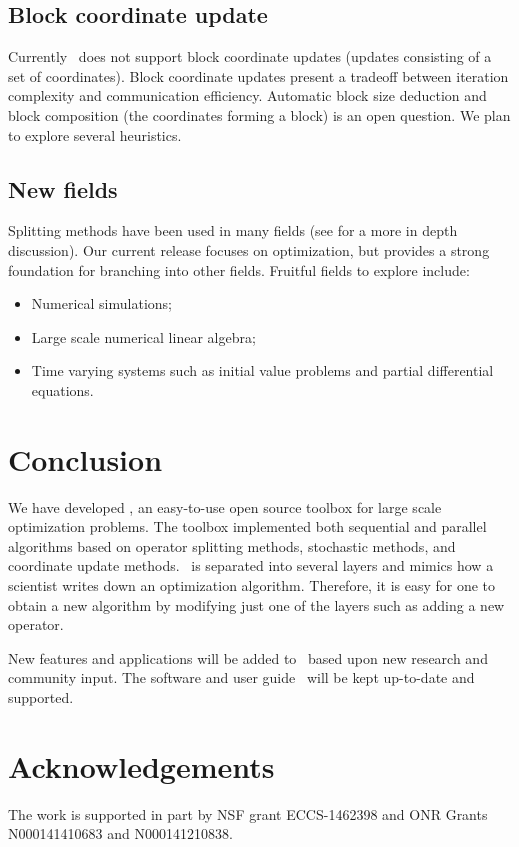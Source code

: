 \subsection{Block coordinate update}
  Currently \pkg~does not support block coordinate updates (updates consisting of a set of coordinates). Block coordinate updates present a tradeoff between iteration complexity and communication efficiency.
  Automatic block size deduction and block composition (the coordinates forming a block) is an open question.
We plan to explore several heuristics.

\subsection{New fields}

Splitting methods have been used in many fields (see \citep{roland2016some} for a more in depth discussion).
Our current release focuses on optimization, but provides a strong foundation for branching into other fields.
Fruitful fields to explore include:

\begin{itemize}
\item Numerical simulations;
\item Large scale numerical linear algebra;
\item Time varying systems such as initial value problems and partial differential equations.
\end{itemize}


\section{Conclusion }
We have developed \pkg, an easy-to-use open source toolbox for large scale optimization problems.
The toolbox implemented both sequential and parallel algorithms based on operator splitting methods, stochastic methods,
and coordinate update methods. \pkg~is separated into several layers and mimics how a scientist writes down an optimization algorithm. Therefore, it is easy for one to obtain a new algorithm by modifying just one of the layers such as adding a new operator.


New features and applications will be added to \pkg~based upon new research and community input. The software and user guide \repo~will be kept up-to-date and supported.

\section{Acknowledgements}
The work is supported in part by NSF grant ECCS-1462398 and ONR Grants N000141410683
and N000141210838. 